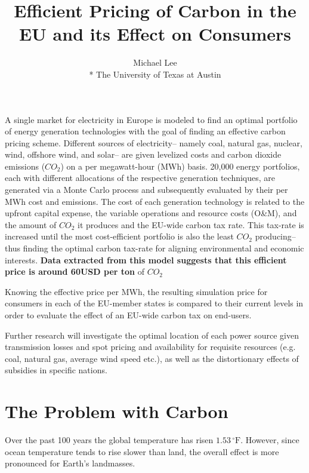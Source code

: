 \documentclass{article}
\title{Efficient Pricing of Carbon in the EU and its Effect on Consumers}
\author{Michael Lee \\*
The University of Texas at Austin}
\begin{document}
\onehalfspacing
\maketitle{}
A single market for electricity in Europe is modeled to find an optimal portfolio of energy generation technologies with the goal of finding an effective carbon pricing scheme. Different sources of electricity-- namely coal, natural gas, nuclear, wind, offshore wind, and solar-- are given levelized costs and carbon dioxide emissions ($CO_{2}$) on a per megawatt-hour (MWh) basis. 20,000 energy portfolios, each with different allocations of the respective generation techniques, are generated via a Monte Carlo process and subsequently evaluated by their per MWh cost and emissions. The cost of each generation technology is related to the upfront capital expense, the variable operations and resource costs (O\&M), and the amount of $CO_{2}$ it produces and the EU-wide carbon tax rate. This tax-rate is increased until the most cost-efficient portfolio is also the least $CO_{2}$ producing-- thus finding the optimal carbon tax-rate for aligning environmental and economic interests. {\bf Data extracted from this model suggests that this efficient price is around 60USD per ton} of $CO_{2}$\*

Knowing the effective price per MWh, the resulting simulation price for consumers in each of the EU-member states is compared to their current levels in order to evaluate the effect of an EU-wide carbon tax on end-users. \*


Further research will investigate the optimal location of each power source given transmission losses and spot pricing and availability for requisite resources (e.g. coal, natural gas, average wind speed etc.), as well as the distortionary effects of subsidies in specific nations.

\newpage{}


\section{The Problem with Carbon}
Over the past 100 years the global temperature has risen $1.53\,^{\circ}\mathrm{F}$. However, since ocean temperature tends to rise slower than land, the overall effect is more pronounced for Earth's landmasses. 
\end{document}
